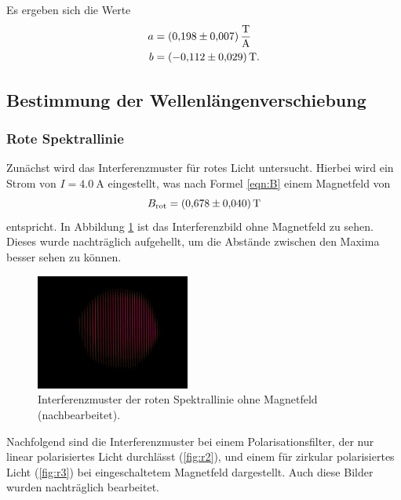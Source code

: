 \FloatBarrier
Es ergeben sich die Werte 
\begin{align*}
    a &= \SI{0.198\pm0.007}{\tesla\per\ampere} \\
    b &= \SI{-0.112\pm0.029}{\tesla}.
\end{align*}

\subsection{Bestimmung der Wellenlängenverschiebung}
\subsubsection{Rote Spektrallinie}
Zunächst wird das Interferenzmuster für rotes Licht untersucht. 
Hierbei wird ein Strom von $I=\SI{4.0}{\ampere}$ eingestellt, was nach Formel \ref{eqn:B} einem Magnetfeld von 
\begin{equation*}
    B_{\si{rot}} = \SI{0.678\pm0.040}{\tesla} 
\end{equation*}
entspricht.
In Abbildung \ref{fig:r1} ist das Interferenzbild ohne Magnetfeld zu sehen. Dieses wurde nachträglich aufgehellt, um die Abstände zwischen den Maxima besser 
sehen zu können.

\FloatBarrier
\begin{figure}
  \centering
  \includegraphics[width=0.45\textwidth]{IMG_0103k.jpg}
  \caption{Interferenzmuster der roten Spektrallinie ohne Magnetfeld (nachbearbeitet).}
  \label{fig:r1}
\end{figure}
\FloatBarrier

Nachfolgend sind die Interferenzmuster bei einem Polarisationsfilter, der nur linear polarisiertes Licht durchlässt (\ref{fig:r2}), und einem für zirkular polarisiertes Licht (\ref{fig:r3}) 
bei eingeschaltetem Magnetfeld dargestellt. Auch diese Bilder wurden nachträglich bearbeitet.

